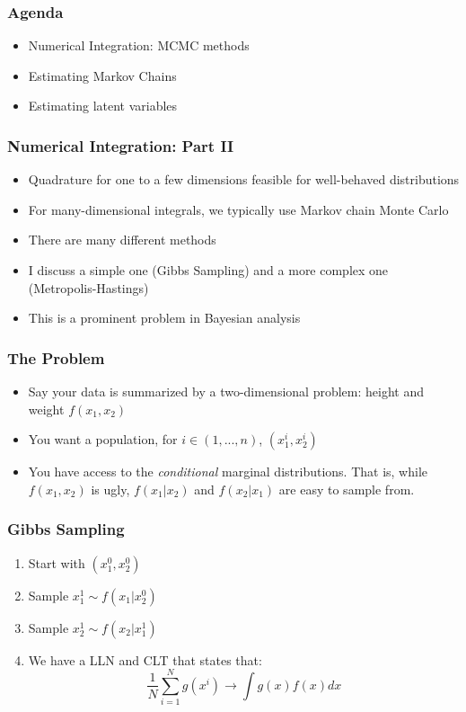 \documentclass{beamer}
\author{Trevor Gallen}
\date{}
\begin{document}
\renewcommand*{\inserttotalframenumber}{\pageref{lastframe}}

\begin{frame}
\titlepage
\end{frame}


\begin{frame}
\frametitle[alignment=center]{Agenda}
\begin{itemize}
\item Numerical Integration: MCMC methods
\bigskip
\item Estimating Markov Chains 
\bigskip
\item Estimating latent variables
\end{itemize}
\end{frame}

\begin{frame}
\frametitle[alignment=center]{Numerical Integration: Part II}
\begin{itemize}
\item Quadrature for one to a few dimensions feasible for well-behaved distributions
\bigskip
\item For many-dimensional integrals, we typically use Markov chain Monte Carlo
\bigskip
\item There are many different methods
\bigskip
\item I discuss a simple one (Gibbs Sampling) and a more complex one (Metropolis-Hastings)
\bigskip
\item This is a prominent problem in Bayesian analysis
\end{itemize}
\end{frame}

\begin{frame}
\frametitle[alignment=center]{The Problem}
\begin{itemize}
\item Say your data is summarized by a two-dimensional problem: height and weight $f(x_1,x_2)$
\bigskip
\item You want a population, for $i\in(1,...,n)$,  $(x_1^{i},x_2^{i})$
\bigskip
\item You have access to the \emph{conditional} marginal distributions.  That is, while $f(x_1,x_2)$ is ugly, 
$f(x_1|x_2)$ and $f(x_2|x_1)$ are easy to sample from.  
\end{itemize}
\end{frame}

\begin{frame}
\frametitle[alignment=center]{Gibbs Sampling}
\begin{enumerate}
\item Start with $(x_1^0,x_2^0)$
\bigskip
\item Sample $x_1^{1}\sim f(x_1|x_2^0)$
\bigskip
\item Sample $x_2^{1}\sim f(x_2|x_1^1)$
\bigskip
\item We have a LLN and CLT that states that:
$$\frac{1}{N}\sum_{i=1}^Ng(x^{i})\rightarrow \int g(x)f(x)dx$$
\end{enumerate}
\end{frame}
\end{document}
